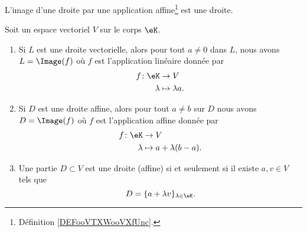 \begin{proposition}     \label{PROPooNTHVooWWyafJ}
	L'image d'une droite par une application affine\footnote{Définition \ref{DEFooVTXWooVXfUnc}.} est une droite.
\end{proposition}

\begin{lemma}       \label{LEMooRWASooOfwjdw}
    Soit un espace vectoriel \( V\) sur le corps \( \eK\).
	\begin{enumerate}
		\item       \label{ITEMooYQCIooOrhRwj}
		      Si \( L\) est une droite vectorielle, alors pour tout \( a\neq 0\) dans \( L\), nous avons \( L=\Image(f)\) où \( f\) est l'application linéaire donnée par
		      \begin{equation}
			      \begin{aligned}
				      f\colon \eK & \to V              \\
				      \lambda     & \mapsto \lambda a.
			      \end{aligned}
		      \end{equation}
		\item       \label{ITEMooZIGMooGruFMP}
		      Si \( D\) est une droite affine, alors pour tout \( a\neq b\) sur \( D\) nous avons \( D=\Image(f)\) où \( f\) est l'application affine donnée par
		      \begin{equation}
			      \begin{aligned}
				      f\colon \eK & \to V                   \\
				      \lambda     & \mapsto a+\lambda(b-a).
			      \end{aligned}
		      \end{equation}
          \item     \label{ITEMooOKJZooIHYDIk}
              Une partie \( D\subset V\) est une droite (affine) si et seulement si il existe \( a,v\in V\) tels que
              \begin{equation}
                  D=\{ a+\lambda v \}_{\lambda\in \eK}.
              \end{equation}
	\end{enumerate}
\end{lemma}

